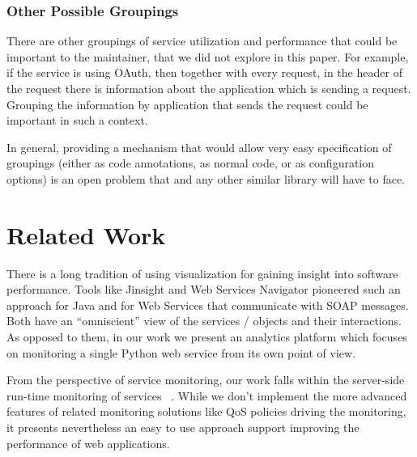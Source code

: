 \documentclass{sig-alternate-05-2015}
\begin{document}
  \subsubsection{Other Possible Groupings}

    There are other groupings of service utilization and performance that could be important to the maintainer, that we did not explore in this paper. For example, if the service is using OAuth, then together with every request, in the header of the request there is information about the application which is sending a request. Grouping the information by application that sends the request could be important in such a context. 

    In general, providing a mechanism that would allow very easy specification of groupings (either as code annotations, as normal code, or as configuration options) is an open problem that \tool and any other similar library will have to face.



\section{Related Work}
\label{sec:related}


There is a long tradition of using visualization for gaining insight into software performance. Tools like Jinsight \cite{Pauw02a} and Web Services Navigator \cite{Pauw05} pioneered such an approach for Java and for Web Services that communicate with SOAP messages. Both have an ``omniscient'' view of the services / objects and their interactions. As opposed to them, in our work we present an analytics platform which focuses on monitoring a single Python web service from its own point of view.

From the perspective of service monitoring, our work falls within the server-side run-time monitoring of services ~\cite{ghezzi2007run}. While we don't implement the more advanced features of related monitoring solutions like QoS policies driving the monitoring, it presents nevertheless an easy to use approach support improving the performance of web applications. 

\end{document}

